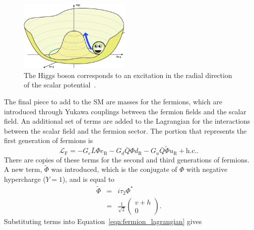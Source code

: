 \begin{figure}[t!]
  \centering
  \includegraphics[width=0.48\textwidth]{figs/theory/Higgs-Potential-radial.png}
  \caption{
    The Higgs boson corresponds to an excitation in the radial direction
    of the scalar potential~\cite{QuantumDiariesHiggs}.
  }
  \label{fig:higgs_mass}
\end{figure}

The final piece to add to the SM are masses for the fermions, which are
introduced through Yukawa couplings between the fermion fields and the scalar
field.
An additional set of terms are added to the Lagrangian for the interactions
between the scalar field and the fermion sector.
The portion that represents the first generation of fermions is
\begin{equation}
  \mathcal{L}_\mathrm{F} =
  - G_e \bar{L} \Phi e_\mathrm{R}
  - G_d \bar{Q} \Phi d_\mathrm{R}
  - G_u \bar{Q} \tilde{\Phi} u_\mathrm{R}
  + \mathrm{h.c.}.
  \label{eqn:fermion_lagrangian}
\end{equation}
There are copies of these terms for the second and third generations of
fermions.
A new term, $\tilde{\Phi}$ was introduced, which is the conjugate of $\Phi$
with negative hypercharge ($Y = 1$), and is equal to
\begin{eqnarray}
  \tilde{\Phi} &=& i \tau_2 \Phi^{*} \\
               &=& \frac{1}{\sqrt{2}} \begin{pmatrix} v + h \\ 0 \end{pmatrix}.
\end{eqnarray}
Substituting terms into Equation~\ref{eqn:fermion_lagrangian} gives
